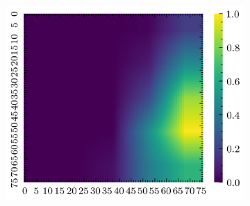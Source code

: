 \documentclass[../document.tex]{subfiles}
\begin{document}
\begin{figure}[H]
\begin{subfigure}[b]{0.19\textwidth}
        \includegraphics[width=\linewidth]{../img/5/quarry/worst/grad-cam-2d-4.png}
    \end{subfigure}  


\end{figure}
\end{document}
